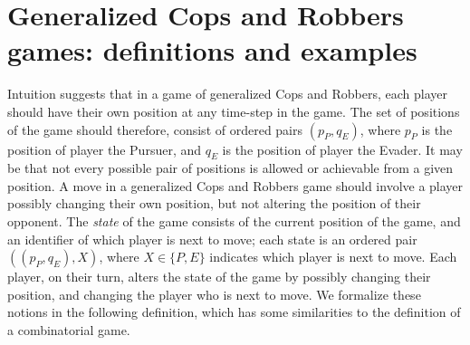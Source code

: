 \documentclass[12pt,reqno]{amsart}
\begin{document}
\section{Generalized Cops and Robbers games: definitions and examples}\label{DefnSec}

Intuition suggests that in a game of generalized Cops and Robbers, each player should have their own position at any time-step in the game.  The set of positions of the game should therefore, consist
of ordered pairs $(p_P, q_E)$, where $p_P$ is the position of player the Pursuer, and $q_E$ is the position of player the Evader.  It may be that not every possible pair of positions is allowed or
achievable from a given position. A move in a generalized Cops and Robbers game should involve a player possibly changing their own position, but not altering the position of their opponent.  The
\emph{state} of the game consists of the current position of the game, and an identifier of which player is next to move; each state is an ordered pair $((p_P, q_E), X)$, where $X \in \{P, E\}$
indicates which player is next to move. Each player, on their turn, alters the state of the game by possibly changing their position, and changing the player who  is next to move. We formalize these
notions in the following definition, which has some similarities to the definition of a combinatorial game.
\end{document}
